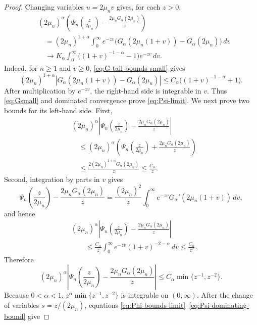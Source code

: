 \documentclass[11pt]{amsart}
\numberwithin{equation}{section}
\theoremstyle{remark}
\begin{document}
\begin{proof}
Changing variables $u=2\mu_nv$ gives, for each $z>0$,
\begin{equation}\label{eq:Psi-limit}
 \begin{aligned}
 &(2\mu_n)^\alpha\left(
 \Psi_n\left(\frac z{2\mu_n}\right)
 -\frac{2\mu_nG_\alpha(2\mu_n)}z\right)\\
 &\quad=(2\mu_n)^{1+\alpha}\int_0^\infty e^{-zv}
 \bigl(G_\alpha(2\mu_n(1+v))-G_\alpha(2\mu_n)\bigr)\,dv\\
 &\quad\longrightarrow K_\alpha\int_0^\infty
 \bigl((1+v)^{-1-\alpha}-1\bigr)e^{-zv}\,dv.
 \end{aligned}
\end{equation}
Indeed, for $n\ge1$ and $v\ge0$, \eqref{eq:G-tail-bounds-small} gives
\[
 (2\mu_n)^{1+\alpha}
 \left|G_\alpha(2\mu_n(1+v))-G_\alpha(2\mu_n)\right|
 \le C_\alpha\bigl((1+v)^{-1-\alpha}+1\bigr).
\]
After multiplication by $e^{-zv}$, the right-hand side is integrable in
$v$.  Thus \eqref{eq:Gsmall} and dominated convergence prove
\eqref{eq:Psi-limit}.  We next prove two bounds for its left-hand side.
First,
\[
 \begin{aligned}
 &(2\mu_n)^\alpha\left|
 \Psi_n\left(\frac z{2\mu_n}\right)
 -\frac{2\mu_nG_\alpha(2\mu_n)}z\right|\\
 &\quad\le(2\mu_n)^\alpha\left(
 \Psi_n\left(\frac z{2\mu_n}\right)
 +\frac{2\mu_nG_\alpha(2\mu_n)}z\right)\\
 &\quad\le\frac{2(2\mu_n)^{1+\alpha}G_\alpha(2\mu_n)}z
 \le\frac{C_\alpha}{z}.
 \end{aligned}
\]
Second, integration by parts in $v$ gives
\[
 \Psi_n\left(\frac z{2\mu_n}\right)
 -\frac{2\mu_nG_\alpha(2\mu_n)}z
 =\frac{(2\mu_n)^2}{z}\int_0^\infty
 e^{-zv}G_\alpha'(2\mu_n(1+v))\,dv,
\]
and hence
\[
 \begin{aligned}
 &(2\mu_n)^\alpha\left|
 \Psi_n\left(\frac z{2\mu_n}\right)
 -\frac{2\mu_nG_\alpha(2\mu_n)}z\right|\\
 &\qquad\le\frac{C_\alpha}{z}
 \int_0^\infty e^{-zv}(1+v)^{-2-\alpha}\,dv
 \le\frac{C_\alpha}{z^2}.
 \end{aligned}
\]
Therefore
\begin{equation}\label{eq:Psi-dominating-bound}
 (2\mu_n)^\alpha\left|
 \Psi_n\left(\frac z{2\mu_n}\right)
 -\frac{2\mu_nG_\alpha(2\mu_n)}z\right|
 \le C_\alpha\min\{z^{-1},z^{-2}\}.
\end{equation}
Because $0<\alpha<1$,
$z^\alpha\min\{z^{-1},z^{-2}\}$ is integrable on $(0,\infty)$.
After the change of variables $s=z/(2\mu_n)$, equations
\eqref{eq:Phi-bounds-limit}--\eqref{eq:Psi-dominating-bound} give

\end{proof}
\end{document}

